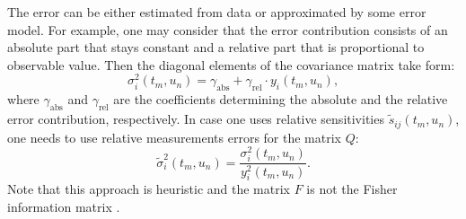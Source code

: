 \documentclass[10pt,A4paper]{article}
\begin{document}
The error can be either estimated from data or approximated by some error model. 
For example, one may consider that the error contribution consists of an absolute part that stays constant and a relative part that is proportional to observable value.
Then the diagonal elements of the covariance matrix take form:
\begin{equation}
\label{eq:error_model}
    \sigma_{i}^2 (t_m, u_n) = \gamma_\text{abs} + \gamma_\text{rel} \cdot y_i(t_m, u_n),
\end{equation}
where $\gamma_\text{abs}$ and $\gamma_\text{rel}$ are the coefficients determining the absolute and the relative error contribution, respectively. 
In case one uses relative sensitivities $\tilde{s}_{ij} (t_m, u_n)$, one needs to use relative measurements errors for the matrix $Q$:
\begin{equation}
    \tilde{\sigma}_{i}^2 (t_m, u_n) = \frac{\sigma_{i}^2 (t_m, u_n)}{y^2_i(t_m, u_n)}.
\end{equation} 
Note that this approach is heuristic and the matrix $F$ is not the Fisher information matrix \cite{}.
%
\end{document}
